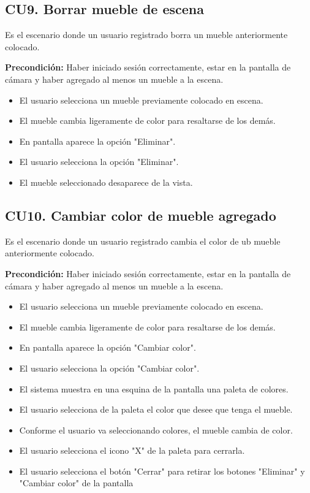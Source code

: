 \subsection{CU9. Borrar mueble de escena}\par
Es el escenario donde un usuario registrado borra un mueble anteriormente colocado.\par
\textbf{Precondición:} Haber iniciado sesión correctamente, estar en la pantalla de cámara y haber agregado al menos un mueble a la escena.\par
\begin{itemize}
	\item El usuario selecciona un mueble previamente colocado en escena.
	\item El mueble cambia ligeramente de color para resaltarse de los demás.
	\item En pantalla aparece la opción "Eliminar".
	\item El usuario selecciona la opción "Eliminar".
	\item El mueble seleccionado desaparece de la vista.
\end{itemize}


\subsection{CU10. Cambiar color de mueble agregado}\par
Es el escenario donde un usuario registrado cambia el color de ub mueble anteriormente colocado.\par
\textbf{Precondición:} Haber iniciado sesión correctamente, estar en la pantalla de cámara y haber agregado al menos un mueble a la escena.\par
\begin{itemize}
	\item El usuario selecciona un mueble previamente colocado en escena.
	\item El mueble cambia ligeramente de color para resaltarse de los demás.
	\item En pantalla aparece la opción "Cambiar color".
	\item El usuario selecciona la opción "Cambiar color".
	\item El sistema muestra en una esquina de la pantalla una paleta de colores.
	\item El usuario selecciona de la paleta el color que desee que tenga el mueble.
	\item Conforme el usuario va seleccionando colores, el mueble cambia de color.
	\item El usuario selecciona el icono "X" de la paleta para cerrarla.
	\item El usuario selecciona el botón "Cerrar" para retirar los botones "Eliminar" y "Cambiar color" de la pantalla
\end{itemize}

